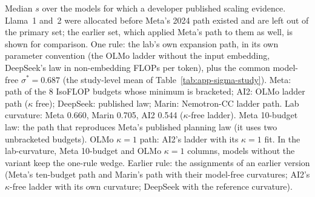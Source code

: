\begin{table}[tp]
\centering
\caption{Lab-Own Technologies under One Rule}
\label{tab:app-labown}
\footnotesize
\setlength{\tabcolsep}{3pt}
\medskip
\begin{tablenotes}
Median $s$ over the models for which a developer published scaling evidence. Llama~1 and~2 were allocated before Meta's 2024 path existed and are left out of the primary set; the earlier set, which applied Meta's path to them as well, is shown for comparison. One rule: the lab's own expansion path, in its own parameter convention (the OLMo ladder without the input embedding, DeepSeek's law in non-embedding FLOPs per token), plus the common model-free $\sigma^*=0.687$ (the study-level mean of Table~\ref{tab:app-sigma-study}). Meta: path of the 8 IsoFLOP budgets whose minimum is bracketed; AI2: OLMo ladder path ($\kappa$ free); DeepSeek: published law; Marin: Nemotron-CC ladder path. Lab curvature: Meta 0.660, Marin 0.705, AI2 0.544 ($\kappa$-free ladder). Meta 10-budget law: the path that reproduces Meta's published planning law (it uses two unbracketed budgets). OLMo $\kappa=1$ path: AI2's ladder with its $\kappa=1$ fit. In the lab-curvature, Meta 10-budget and OLMo $\kappa=1$ columns, models without the variant keep the one-rule wedge. Earlier rule: the assignments of an earlier version (Meta's ten-budget path and Marin's path with their model-free curvatures; AI2's $\kappa$-free ladder with its own curvature; DeepSeek with the reference curvature).
\end{tablenotes}
\end{table}
